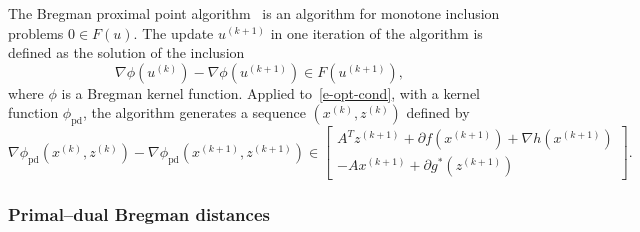\documentclass[letterpaper,11pt]{article}
\begin{document}
The Bregman proximal point algorithm~\cite{Eck:93,CeZ:97,Gul:94}
is an algorithm for monotone inclusion problems $0 \in F(u)$.  
The update $u^{(k+1)}$ in one iteration of the algorithm is defined 
as the solution of the inclusion
\[
\nabla \phi(u^{(k)}) - \nabla \phi(u^{(k+1)}) \in F(u^{(k+1)}),
\]
where $\phi$ is a Bregman kernel function.
Applied to~\eqref{e-opt-cond}, with a kernel function
$\phi_\mathrm{pd}$, the algorithm generates a sequence 
$(x^{(k)}, z^{(k)})$ defined by 
\begin{equation} \label{e-bcv-ppa}
\nabla \phi_\mathrm{pd}(x^{(k)},z^{(k)}) 
-\nabla \phi_\mathrm{pd}(x^{(k+1)},z^{(k+1)})
\in 
\begin{bmatrix} A^T z^{(k+1)} +  
\partial f(x^{(k+1)})+\nabla h(x^{(k+1)}) \\ 
-A x^{(k+1)} + \partial g^\ast(z^{(k+1)}) \end{bmatrix}.
\end{equation}

\subsubsection{Primal--dual Bregman distances} \label{s-pd-dist}
\end{document}
